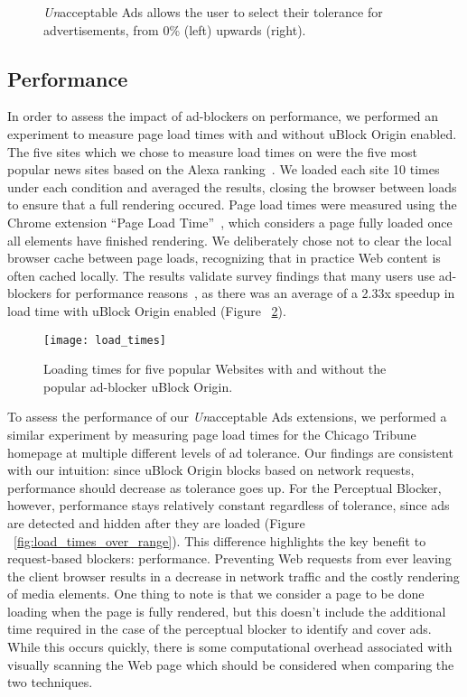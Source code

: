 \begin{figure}[h]
\hfill
{}
\hfill
{}
\hfill
\caption{\textit{Un}acceptable Ads allows the user to select their tolerance for advertisements, from 0\% (left) upwards (right).}
\label{fig:unacceptable}
\end{figure}

\subsection{Performance}
In order to assess the impact of ad-blockers on performance, we performed an experiment to measure page load times with and without uBlock Origin enabled.
The five sites which we chose to measure load times on were the five most popular news sites based on the Alexa ranking~\cite{alexa}.
We loaded each site 10 times under each condition and averaged the results, closing the browser between loads to ensure that a full rendering occured.
Page load times were measured using the Chrome extension ``Page Load Time''~\cite{pageloadtime}, which considers a page fully loaded once all elements have finished rendering.
We deliberately chose not to clear the local browser cache between page loads, recognizing that in practice Web content is often cached locally.
The results validate survey findings that many users use ad-blockers for performance reasons~\cite{hubspot2016adblock}, as there was an average of a 2.33x speedup in load time with uBlock Origin enabled (Figure ~\ref{fig:load_times}).

\begin{figure}[h]
\centering
\texttt{[image: load\_times]}
\caption{Loading times for five popular Websites with and without the popular ad-blocker uBlock Origin.}
\label{fig:load_times}
\end{figure}

To assess the performance of our \textit{Un}acceptable Ads extensions, we performed a similar experiment by measuring page load times for the Chicago Tribune homepage at multiple different levels of ad tolerance.
Our findings are consistent with our intuition: since uBlock Origin blocks based on network requests, performance should decrease as tolerance goes up.
For the Perceptual Blocker, however, performance stays relatively constant regardless of tolerance, since ads are detected and hidden after they are loaded (Figure ~\ref{fig:load_times_over_range}).
This difference highlights the key benefit to request-based blockers: performance.
Preventing Web requests from ever leaving the client browser results in a decrease in network traffic and the costly rendering of media elements.
One thing to note is that we consider a page to be done loading when the page is fully rendered, but this doesn't include the additional time required in the case of the perceptual blocker to identify and cover ads.
While this occurs quickly, there is some computational overhead associated with visually scanning the Web page which should be considered when comparing the two techniques.

